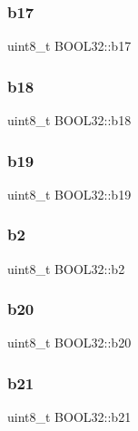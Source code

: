 \subsubsection{\texorpdfstring{b17}{b17}}
{\footnotesize\ttfamily uint8\+\_\+t B\+O\+O\+L32\+::b17}

\hypertarget{struct_b_o_o_l32_ae0a4d950647d4fac9cb20f7e29516bc6}{}\label{struct_b_o_o_l32_ae0a4d950647d4fac9cb20f7e29516bc6} 
\subsubsection{\texorpdfstring{b18}{b18}}
{\footnotesize\ttfamily uint8\+\_\+t B\+O\+O\+L32\+::b18}

\hypertarget{struct_b_o_o_l32_aefb41a8da65649ab100c79563185fb72}{}\label{struct_b_o_o_l32_aefb41a8da65649ab100c79563185fb72} 
\subsubsection{\texorpdfstring{b19}{b19}}
{\footnotesize\ttfamily uint8\+\_\+t B\+O\+O\+L32\+::b19}

\hypertarget{struct_b_o_o_l32_a640276807605e096aad087624eb203d6}{}\label{struct_b_o_o_l32_a640276807605e096aad087624eb203d6} 
\subsubsection{\texorpdfstring{b2}{b2}}
{\footnotesize\ttfamily uint8\+\_\+t B\+O\+O\+L32\+::b2}

\hypertarget{struct_b_o_o_l32_aff33443afd6538991cf18479f3869adb}{}\label{struct_b_o_o_l32_aff33443afd6538991cf18479f3869adb} 
\subsubsection{\texorpdfstring{b20}{b20}}
{\footnotesize\ttfamily uint8\+\_\+t B\+O\+O\+L32\+::b20}

\hypertarget{struct_b_o_o_l32_a74c9adb5c81e2174331072bca9318e31}{}\label{struct_b_o_o_l32_a74c9adb5c81e2174331072bca9318e31} 
\subsubsection{\texorpdfstring{b21}{b21}}
{\footnotesize\ttfamily uint8\+\_\+t B\+O\+O\+L32\+::b21}

